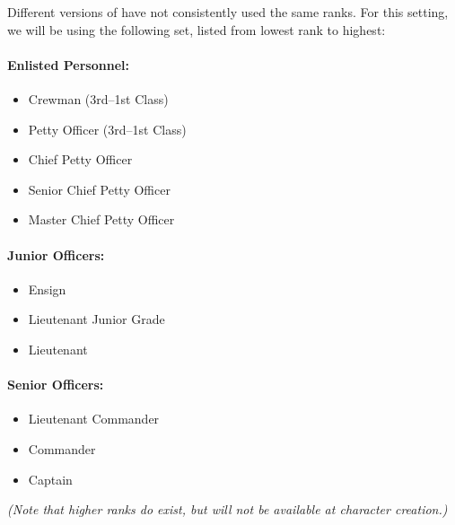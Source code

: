 \documentclass[12pt,titlepage,openany]{book}
\begin{document}
Different versions of \StarTrek{} have not consistently used the same ranks.
For this setting, we will be using the following set, listed from lowest rank
to highest:

\begin{multicols}{2}
    \raggedcolumns
    \paragraph{Enlisted Personnel:}
    \begin{itemize}
        \item Crewman (3rd--1st Class)
        \item Petty Officer (3rd--1st Class)
        \item Chief Petty Officer
        \item Senior Chief Petty Officer
        \item Master Chief Petty Officer
    \end{itemize}

    \columnbreak
    \paragraph{Junior Officers:}
    \begin{itemize}
        \item Ensign
        \item Lieutenant Junior Grade
        \item Lieutenant
    \end{itemize}

    \paragraph{Senior Officers:}
    \begin{itemize}
        \item Lieutenant Commander
        \item Commander
        \item Captain
    \end{itemize}
\end{multicols}

\noindent \emph{(Note that higher ranks do exist, but will not be available at
character creation.)}

\vspace{1em}
\end{document}

